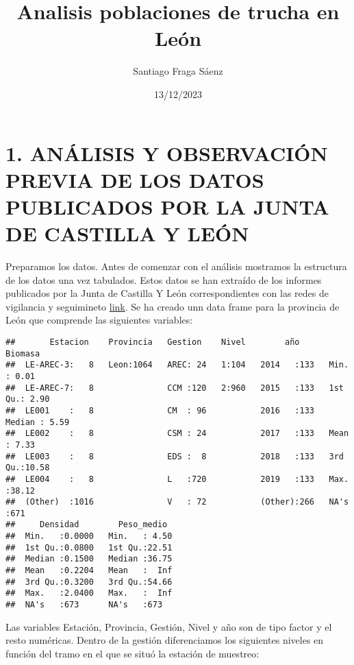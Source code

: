 \documentclass[
]{article}
\title{Analisis poblaciones de trucha en León}
\author{Santiago Fraga Sáenz}
\date{13/12/2023}
\begin{document}
\maketitle

{
\setcounter{tocdepth}{5}
\tableofcontents
}
\hypertarget{anuxe1lisis-y-observaciuxf3n-previa-de-los-datos-publicados-por-la-junta-de-castilla-y-leuxf3n}{%
\section{1. ANÁLISIS Y OBSERVACIÓN PREVIA DE LOS DATOS PUBLICADOS POR LA
JUNTA DE CASTILLA Y
LEÓN}\label{anuxe1lisis-y-observaciuxf3n-previa-de-los-datos-publicados-por-la-junta-de-castilla-y-leuxf3n}}

Preparamos los datos. Antes de comenzar con el análisis mostramos la
estructura de los datos una vez tabulados. Estos datos se han extraído
de los informes publicados por la Junta de Castilla Y León
correspondientes con las redes de vigilancia y seguimineto
\href{https://medioambiente.jcyl.es/web/es/caza-pesca/informes-seguimiento-control-poblaciones.html}{link}.
Se ha creado unn data frame para la provincia de León que comprende las
siguientes variables:

\begin{verbatim}
##       Estacion    Provincia   Gestion    Nivel        año         Biomasa     
##  LE-AREC-3:   8   Leon:1064   AREC: 24   1:104   2014   :133   Min.   : 0.01  
##  LE-AREC-7:   8               CCM :120   2:960   2015   :133   1st Qu.: 2.90  
##  LE001    :   8               CM  : 96           2016   :133   Median : 5.59  
##  LE002    :   8               CSM : 24           2017   :133   Mean   : 7.33  
##  LE003    :   8               EDS :  8           2018   :133   3rd Qu.:10.58  
##  LE004    :   8               L   :720           2019   :133   Max.   :38.12  
##  (Other)  :1016               V   : 72           (Other):266   NA's   :671    
##     Densidad        Peso_medio   
##  Min.   :0.0000   Min.   : 4.50  
##  1st Qu.:0.0800   1st Qu.:22.51  
##  Median :0.1500   Median :36.75  
##  Mean   :0.2204   Mean   :  Inf  
##  3rd Qu.:0.3200   3rd Qu.:54.66  
##  Max.   :2.0400   Max.   :  Inf  
##  NA's   :673      NA's   :673
\end{verbatim}

Las variables Estación, Provincia, Gestión, Nivel y año son de tipo
factor y el resto numéricas. Dentro de la gestión diferenciamos los
siguientes niveles en función del tramo en el que se situó la estación
de muestreo:
\end{document}
